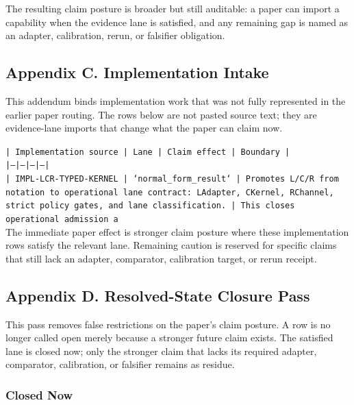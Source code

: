 \documentclass[11pt]{article}
\begin{document}
The resulting claim posture is broader but still auditable: a paper can import a capability when the evidence lane is satisfied, and any remaining gap is named as an adapter, calibration, rerun, or falsifier obligation.

\subsection*{Appendix C. Implementation Intake}

This addendum binds implementation work that was not fully represented in the earlier paper routing. The rows below are not pasted source text; they are evidence-lane imports that change what the paper can claim now.

\noindent\texttt{| Implementation source | Lane | Claim effect | Boundary |}\\
\noindent\texttt{|---|---|---|---|}\\
\noindent\texttt{| IMPL-LCR-TYPED-KERNEL | `normal\_form\_result` | Promotes L/C/R from notation to operational lane contract: LAdapter, CKernel, RChannel, strict policy gates, and lane classification. | This closes operational admission a}\\

The immediate paper effect is stronger claim posture where these implementation rows satisfy the relevant lane. Remaining caution is reserved for specific claims that still lack an adapter, comparator, calibration target, or rerun receipt.

\subsection*{Appendix D. Resolved-State Closure Pass}

This pass removes false restrictions on the paper's claim posture. A row is no longer called open merely because a stronger future claim exists. The satisfied lane is closed now; only the stronger claim that lacks its required adapter, comparator, calibration, or falsifier remains as residue.

\subsubsection*{Closed Now}
\end{document}

